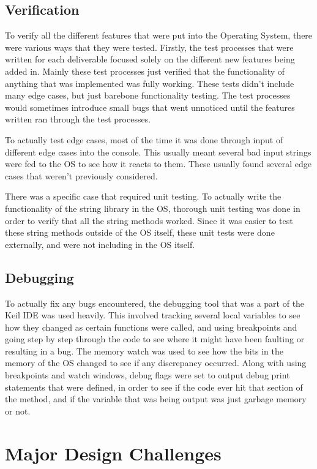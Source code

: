 \documentclass[se]{uw-wkrpt}
\begin{document}
\subsection{Verification}
To verify all the different features that were put into the Operating System, there were various ways that they were tested. Firstly, the test processes that were written for each deliverable focused solely on the different new features being added in. Mainly these test processes just verified that the functionality of anything that was implemented was fully working. These tests didn't include many edge cases, but just barebone functionality testing. The test processes would sometimes introduce small bugs that went unnoticed until the features written ran through the test processes. 

To actually test edge cases, most of the time it was done through input of different edge cases into the console. This usually meant several bad input strings were fed to the OS to see how it reacts to them. These usually found several edge cases that weren't previously considered. 

There was a specific case that required unit testing. To actually write the functionality of the string library in the OS, thorough unit testing was done in order to verify that all the string methods worked. Since it was easier to test these string methods outside of the OS itself, these unit tests were done externally, and were not including in the OS itself.

\subsection{Debugging}

To actually fix any bugs encountered, the debugging tool that was a part of the Keil IDE was used heavily. This involved tracking several local variables to see how they changed as certain functions were called, and using breakpoints and going step by step through the code to see where it might have been faulting or resulting in a bug. The memory watch was used to see how the bits in the memory of the OS changed to see if any discrepancy occurred. Along with using breakpoints and watch windows, debug flags were set to output debug print statements that were defined, in order to see if the code ever hit that section of the method, and if the variable that was being output was just garbage memory or not.

\section{Major Design Challenges}\label{sec:design}
\end{document}
